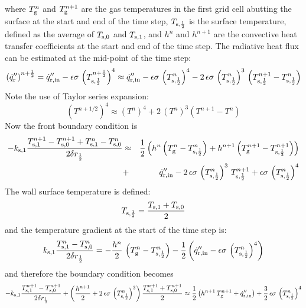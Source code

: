 where $T_{\rm g}^n$ and $T_{\rm g}^{n+1}$ are the gas temperatures in the first grid cell abutting the surface at the start and end of the time step, $T_{\rm s,\frac{1}{2}}$ is the surface temperature, defined as the average of $T_{\rm s,0}$ and $T_{\rm s,1}$, and $h^n$ and $h^{n+1}$ are the convective heat transfer coefficients at the start and end of the time step. The radiative heat flux can be estimated at the mid-point of the time step:
\begin{equation}
\label{radi}
\left( \dot{q}_{\rm r}'' \right)^{n+\frac{1}{2}} = \dot{q}_{\rm r, in}'' - \epsilon \sigma \, \left( T_{\rm s,\frac{1}{2}}^{n+\frac{1}{2}} \right)^4
  \approx \dot{q}_{\rm r, in}'' - \epsilon \sigma \, \left( T_{\rm s,\frac{1}{2}}^n \right)^4 - 2 \, \epsilon\sigma \, \left( T_{\rm s,\frac{1}{2}}^n \right)^3 \, \left( T_{\rm s,\frac{1}{2}}^{n+1}-T_{\rm s,\frac{1}{2}}^n \right)
\end{equation}
Note the use of Taylor series expansion:
\begin{equation}
\label{T_taylor}
(T^{n+1/2})^4 \approx (T^n)^4 + 2 \, (T^n)^3 (T^{n+1}-T^n)
\end{equation}
Now the front boundary condition is
\begin{eqnarray}
\label{bc_front_2}
  -k_{\rm s,1} \frac{T_{\rm s,1}^{n+1}-T_{\rm s,0}^{n+1} + T_{\rm s,1}^{n}-T_{\rm s,0}^{n}}{2 \delta r_{\frac{1}{2}}}
  &\approx& \frac{1}{2} \left( h^n \left(T_{\rm g}^n - T_{\rm s,\frac{1}{2}}^n\right) + h^{n+1} \left(T_{\rm g}^{n+1} - T_{\rm s,\frac{1}{2}}^{n+1} \right) \right) \nonumber \\ &+&
  \dot{q}_{\rm r, in}'' - 2 \, \epsilon\sigma \, \left(T_{\rm s,\frac{1}{2}}^n \right)^3 \, T_{\rm s,\frac{1}{2}}^{n+1} +  \epsilon\sigma \, \left( T_{\rm s,\frac{1}{2}}^n \right)^4
\end{eqnarray}
The wall surface temperature is defined:
\begin{equation}
\label{T_front}
  T_{\rm s,\frac{1}{2}} = \frac{T_{\rm s,1}+T_{\rm s,0}}{2}
\end{equation}
and the temperature gradient at the start of the time step is:
\begin{equation}
k_{\rm s,1} \frac{T_{\rm s,1}^{n}-T_{\rm s,0}^{n}}{2 \delta r_{\frac{1}{2}}} = -\frac{h^n}{2} \, \left( T_{\rm g}^n - T_{\rm s,\frac{1}{2}}^n \right) - \frac{1}{2} \left( \dot{q}_{\rm r, in}'' - \epsilon \sigma \, \left( T_{\rm s,\frac{1}{2}}^{n} \right)^4 \right)
\end{equation}
and therefore the boundary condition becomes
\begin{equation}
\label{bc_front_4}
  -k_{\rm s,1} \frac{T_{\rm s,1}^{n+1}-T_{\rm s,0}^{n+1}}{2 \delta r_{\frac{1}{2}}} + \left( \frac{h^{n+1}}{2} + 2 \, \epsilon\sigma \, \left( T_{\rm s,\frac{1}{2}}^n \right)^3 \right) \frac{T_{\rm s,1}^{n+1}+T_{\rm s,0}^{n+1}}{2}
  \approx  \frac{1}{2} \left( h^{n+1} \, T_{\rm g}^{n+1} +
  \dot{q}_{\rm r, in}'' \right) + \frac{3}{2} \, \epsilon\sigma \, \left( T_{\rm s,\frac{1}{2}}^n \right)^4
\end{equation}
